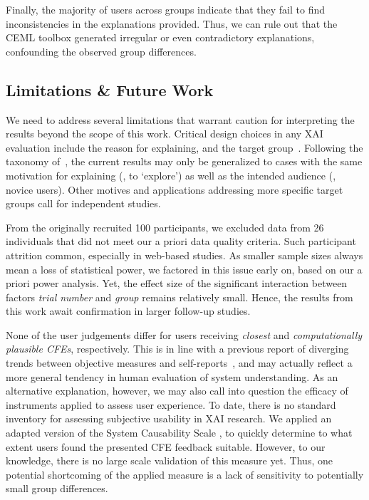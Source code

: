 Finally, the majority of users across groups indicate that they fail to find inconsistencies in the explanations provided.
Thus, we can rule out that the CEML toolbox generated irregular or even contradictory explanations, confounding the observed group differences.

\subsection{Limitations \& Future Work}\label{subsec:limitations-future-work}

We need to address several limitations that warrant caution for interpreting the results beyond the scope of this work.
Critical design choices in any \gls{XAI} evaluation include the reason for explaining, and the target group~\cite{adadi_peeking_2018}.
Following the taxonomy of~\citeauthor{adadi_peeking_2018}, the current results may only be generalized to cases with the same motivation for explaining (\ie, to `explore') as well as the intended audience (\ie, novice users).
Other motives and applications addressing more specific target groups call for independent studies.

From the originally recruited 100 participants, we excluded data from 26 individuals that did not meet our a priori data quality criteria.
Such participant attrition common, especially in web-based studies. 
As smaller sample sizes always mean a loss of statistical power, we factored in this issue early on, based on our a priori power analysis. 
Yet, the effect size of the significant interaction between factors \textit{trial number} and \textit{group} remains relatively small. 
Hence, the results from this work await confirmation in larger follow-up studies.

None of the user judgements differ for users receiving \textit{closest} and \textit{computationally plausible \glspl{CFE}}, respectively.
This is in line with a previous report of diverging trends between objective measures and self-reports~\citep{van_der_waa_evaluating_2021}, and may actually reflect a more general tendency in human evaluation of system understanding.
As an alternative explanation, however, we may also call into question the efficacy of instruments applied to assess user experience. 
To date, there is no standard inventory for assessing subjective usability in \gls{XAI} research.
We applied an adapted version of the System Causability Scale \cite{holzinger_measuring_2020}, to quickly determine to what extent users found the presented \gls{CFE} feedback suitable.
However, to our knowledge, there is no large scale validation of this measure yet.
Thus, one potential shortcoming of the applied measure is a lack of sensitivity to potentially small group differences.

